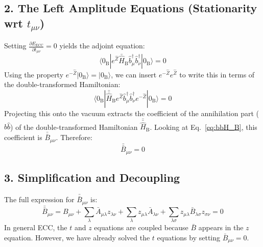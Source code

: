 \subsection*{2. The Left Amplitude Equations (Stationarity wrt $t_{\mu\nu}$)}

Setting $\frac{\partial E_{\text{ECC}}}{\partial t_{\mu\nu}} = 0$ yields the adjoint equation:
\begin{equation}
    \langle 0_{\mathrm{B}}| e^{\hat{Z}} \bar{\hat{H}}_{\mathrm{B}} \hat{b}^\dagger_{\mu} \hat{b}^\dagger_{\nu} | 0_{\mathrm{B}} \rangle = 0
\end{equation}
Using the property $e^{-\hat{Z}} | 0_{\mathrm{B}} \rangle = | 0_{\mathrm{B}} \rangle$, we can insert $e^{-\hat{Z}} e^{\hat{Z}}$ to write this in terms of the double-transformed Hamiltonian:
\begin{equation}
    \langle 0_{\mathrm{B}}| \bar{\bar{\hat{H}}}_{\mathrm{B}} e^{\hat{Z}} \hat{b}^\dagger_{\mu} \hat{b}^\dagger_{\nu} e^{-\hat{Z}} | 0_{\mathrm{B}} \rangle = 0
\end{equation}
Projecting this onto the vacuum extracts the coefficient of the annihilation part ($\hat{b}\hat{b}$) of the double-transformed Hamiltonian $\bar{\bar{\hat{H}}}_{\mathrm{B}}$. Looking at Eq.~\eqref{eq:bbH_B}, this coefficient is $\bar{\bar{B}}_{\mu\nu}$. Therefore:
\begin{equation}
    \bar{\bar{B}}_{\mu\nu} = 0
\end{equation}

\subsection*{3. Simplification and Decoupling}

The full expression for $\bar{\bar{B}}_{\mu\nu}$ is:
\begin{equation}
    \bar{\bar{B}}_{\mu \nu} = B_{\mu \nu} + \sum_{\lambda} \bar{A}_{\mu \lambda} z_{\lambda \nu} + \sum_\lambda z_{\mu \lambda} \bar{A}_{\lambda \nu} + \sum_{\lambda \sigma} z_{\mu \lambda } \bar{B}_{\lambda \sigma} z_{\sigma \nu} = 0
\end{equation}
In general ECC, the $t$ and $z$ equations are coupled because $\bar{B}$ appears in the $z$ equation. However, we have already solved the $t$ equations by setting $\bar{B}_{\mu\nu} = 0$. 

